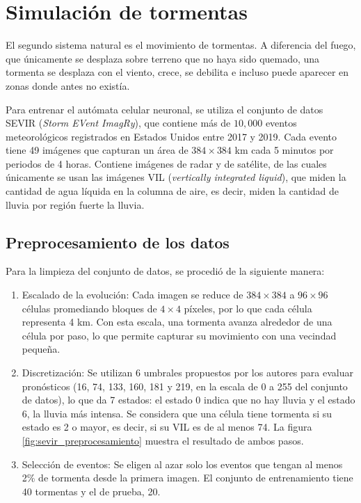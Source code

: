 \section{Simulación de tormentas}

El segundo sistema natural es el movimiento de tormentas. A diferencia del fuego, que únicamente se desplaza sobre terreno que no haya sido quemado, una tormenta se desplaza con el viento, crece, se debilita e incluso puede aparecer en zonas donde antes no existía.

Para entrenar el autómata celular neuronal, se utiliza el conjunto de datos SEVIR (\textit{Storm EVent ImagRy}), que contiene más de $10{,}000$ eventos meteorológicos registrados en Estados Unidos entre 2017 y 2019. Cada evento tiene 49 imágenes que capturan un área de $384 \times 384$ km cada 5 minutos por periodos de 4 horas. Contiene imágenes de radar y de satélite, de las cuales únicamente se usan las imágenes VIL (\textit{vertically integrated liquid}), que miden la cantidad de agua líquida en la columna de aire, es decir, miden la cantidad de lluvia por región fuerte la lluvia. 

\subsection{Preprocesamiento de los datos}

Para la limpieza del conjunto de datos, se procedió de la siguiente manera:

\begin{enumerate}
	\item Escalado de la evolución: Cada imagen se reduce de $384 \times 384$ a $96 \times 96$ células promediando bloques de $4 \times 4$ píxeles, por lo que cada célula representa 4 km. Con esta escala, una tormenta avanza alrededor de una célula por paso, lo que permite capturar su movimiento con una vecindad pequeña.

	\item Discretización: Se utilizan 6 umbrales propuestos por los autores para evaluar pronósticos (16, 74, 133, 160, 181 y 219, en la escala de 0 a 255 del conjunto de datos), lo que da 7 estados: el estado 0 indica que no hay lluvia y el estado 6, la lluvia más intensa. Se considera que una célula tiene tormenta si su estado es 2 o mayor, es decir, si su VIL es de al menos 74. La figura \ref{fig:sevir_preprocesamiento} muestra el resultado de ambos pasos.

	\item Selección de eventos: Se eligen al azar solo los eventos que tengan al menos 2\% de tormenta desde la primera imagen. El conjunto de entrenamiento tiene 40 tormentas y el de prueba, 20.
\end{enumerate}

